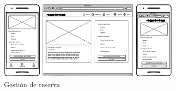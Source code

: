 \begin{figure}[H]
	\centering
	\includegraphics[width=0.8\textwidth]{5-AnalisisDelSistemaDeInformacion/InterfacesDeUsuario/Detalles de reserva/detalles.png}
	\caption{Gestión de reserva}
\end{figure}